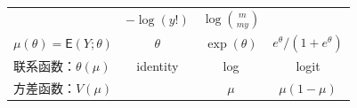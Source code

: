 \documentclass[12pt,a4paper,UTF8,twoside]{book}
\theoremstyle{definition}
\theoremstyle{definition}
\theoremstyle{definition}
\theoremstyle{remark}
\begin{document}
\begin{longtable}[]{@{}lccc@{}}
\begin{minipage}[t]{0.22\columnwidth}
\end{minipage} & \begin{minipage}[t]{0.22\columnwidth}\centering
\(-\log(y!)\)\strut
\end{minipage} & \begin{minipage}[t]{0.22\columnwidth}\centering
\(\log\binom{m}{my}\)\strut
\end{minipage}\tabularnewline
\begin{minipage}[t]{0.21\columnwidth}\raggedright
\(\mu(\theta) = \mathsf{E}(Y;\theta)\)\strut
\end{minipage} & \begin{minipage}[t]{0.22\columnwidth}\centering
\(\theta\)\strut
\end{minipage} & \begin{minipage}[t]{0.22\columnwidth}\centering
\(\exp(\theta)\)\strut
\end{minipage} & \begin{minipage}[t]{0.22\columnwidth}\centering
\(e^{\theta}/(1+e^{\theta})\)\strut
\end{minipage}\tabularnewline
\begin{minipage}[t]{0.21\columnwidth}\raggedright
联系函数：\(\theta(\mu)\)\strut
\end{minipage} & \begin{minipage}[t]{0.22\columnwidth}\centering
identity\strut
\end{minipage} & \begin{minipage}[t]{0.22\columnwidth}\centering
log\strut
\end{minipage} & \begin{minipage}[t]{0.22\columnwidth}\centering
logit\strut
\end{minipage}\tabularnewline
\begin{minipage}[t]{0.21\columnwidth}\raggedright
方差函数：\(V(\mu)\)\strut
\end{minipage} & \begin{minipage}[t]{0.22\columnwidth}\centering
1\strut
\end{minipage} & \begin{minipage}[t]{0.22\columnwidth}\centering
\(\mu\)\strut
\end{minipage} & \begin{minipage}[t]{0.22\columnwidth}\centering
\(\mu(1-\mu)\)\strut
\end{minipage}\tabularnewline
\bottomrule
\end{longtable}
\end{document}
